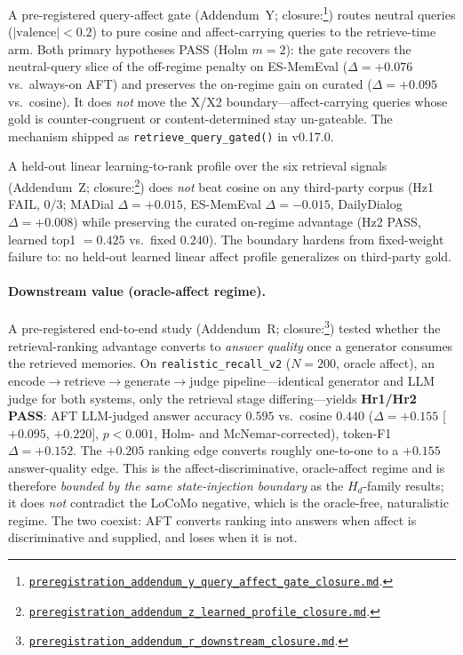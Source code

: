 \documentclass[11pt]{article}
\newcommand{\repourl}{https://github.com/gianlucamazza/emotional-memory}%
\begin{document}
A pre-registered query-affect gate (Addendum~Y; closure:\footnote{%
\href{\repourl/blob/main/benchmarks/preregistration\_addendum\_y\_query\_affect\_gate\_closure.md}%
{\texttt{preregistration\_addendum\_y\_query\_affect\_gate\_closure.md}}.}) routes
neutral queries ($\lvert\mathrm{valence}\rvert<0.2$) to pure cosine and affect-carrying
queries to the retrieve-time arm. Both primary hypotheses PASS (Holm $m=2$): the gate
recovers the neutral-query slice of the off-regime penalty on ES-MemEval
($\Delta=+0.076$ vs.\ always-on AFT) and preserves the on-regime gain on curated
($\Delta=+0.095$ vs.\ cosine). It does \emph{not} move the X/X2 boundary---affect-carrying
queries whose gold is counter-congruent or content-determined stay un-gateable. The
mechanism shipped as \texttt{retrieve\_query\_gated()} in v0.17.0.

A held-out linear learning-to-rank profile over the six retrieval signals
(Addendum~Z; closure:\footnote{%
\href{\repourl/blob/main/benchmarks/preregistration\_addendum\_z\_learned\_profile\_closure.md}%
{\texttt{preregistration\_addendum\_z\_learned\_profile\_closure.md}}.}) does
\emph{not} beat cosine on any third-party corpus (Hz1 FAIL, $0/3$; MADial
$\Delta=+0.015$, ES-MemEval $\Delta=-0.015$, DailyDialog $\Delta=+0.008$) while
preserving the curated on-regime advantage (Hz2 PASS, learned top1 $=0.425$ vs.\
fixed $0.240$). The boundary hardens from fixed-weight failure to: no held-out
learned linear affect profile generalizes on third-party gold.


\paragraph{Downstream value (oracle-affect regime).}
A pre-registered end-to-end study (Addendum~R; closure:\footnote{%
\href{\repourl/blob/main/benchmarks/preregistration\_addendum\_r\_downstream\_closure.md}%
{\texttt{preregistration\_addendum\_r\_downstream\_closure.md}}.}) tested whether the
retrieval-ranking advantage converts to \emph{answer quality} once a generator consumes
the retrieved memories. On \texttt{realistic\_recall\_v2} ($N=200$, oracle affect), an
\mbox{encode$\to$retrieve$\to$generate$\to$judge} pipeline---identical generator and
LLM judge for both systems, only the retrieval stage differing---yields
\textbf{Hr1/Hr2 PASS}: AFT LLM-judged answer accuracy $0.595$ vs.\ cosine $0.440$
($\Delta=+0.155$ [$+0.095$, $+0.220$], $p<0.001$, Holm- and McNemar-corrected),
token-F1 $\Delta=+0.152$. The $+0.205$ ranking edge converts roughly one-to-one to a
$+0.155$ answer-quality edge. This is the affect-discriminative, oracle-affect regime
and is therefore \emph{bounded by the same state-injection boundary} as the
$H_{d}$-family results; it does \emph{not} contradict the LoCoMo negative, which is the
oracle-free, naturalistic regime. The two coexist: AFT converts ranking into answers
when affect is discriminative and supplied, and loses when it is not.




\end{document}
